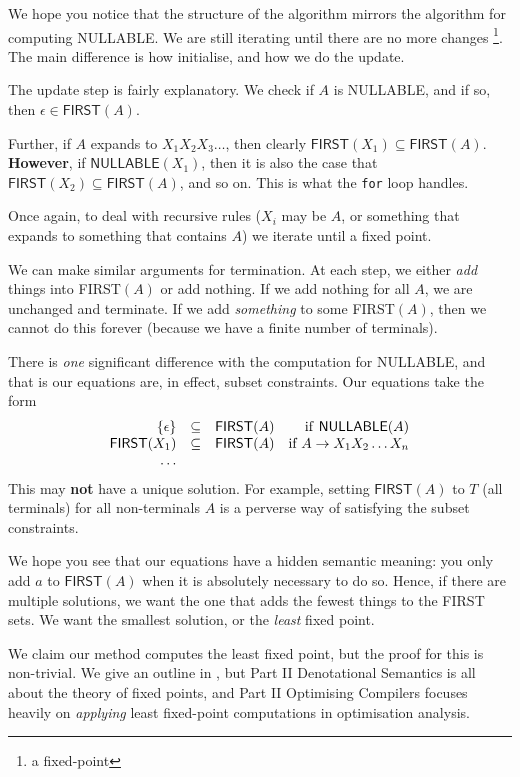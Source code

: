 We hope you notice that the structure of the algorithm mirrors the algorithm for computing \textsf{NULLABLE}. We are still iterating until there are no more changes \footnote{a fixed-point}. The main difference is how initialise, and how we do the update. 

The update step is fairly explanatory. We check if $A$ is \textsf{NULLABLE}, and if so, then $\epsilon \in \textsf{FIRST}(A)$. 

Further, if $A$ expands to $X_1X_2X_3\ldots$, then clearly $\textsf{FIRST}(X_1) \subseteq \textsf{FIRST}(A)$. \textbf{However}, if $\textsf{NULLABLE}(X_1)$, then it is also the case that $\textsf{FIRST}(X_2) \subseteq \textsf{FIRST}(A)$, and so on. This is what the \texttt{for} loop handles.

Once again, to deal with recursive rules ($X_i$ may be $A$, or something that expands to something that contains $A$) we iterate until a fixed point.

We can make similar arguments for termination. At each step, we either \textit{add} things into \textsf{FIRST}$(A)$ or add nothing. If we add nothing for all $A$, we are unchanged and terminate. If we add \textit{something} to some \textsf{FIRST}$(A)$, then we cannot do this forever (because we have a finite number of terminals). 

There is \textit{one} significant difference with the computation for \textsf{NULLABLE}, and that is our equations are, in effect, subset constraints. Our equations take the form
\[
\begin{array}{rclr}
     \{ \epsilon \}&\subseteq&\textsf{FIRST}(A) & \text{if \textsf{NULLABLE}}(A) \\
     \textsf{FIRST}(X_1)&\subseteq&\textsf{FIRST}(A) & \text{if } A \to X_1X_2\ldots X_n \\
     \ldots &&& 
\end{array}
\]
This may \textbf{not} have a unique solution. For example, setting $\textsf{FIRST}(A)$ to $T$ (all terminals) for all non-terminals $A$ is a perverse way of satisfying the subset constraints.

We hope you see that our equations have a hidden semantic meaning: you only add $a$ to $\textsf{FIRST}(A)$ when it is absolutely necessary to do so. Hence, if there are multiple solutions, we want the one that adds the fewest things to the \textsf{FIRST} sets. We want the smallest solution, or the \textit{least} fixed point.

We claim our method computes the least fixed point, but the proof for this is non-trivial. We give an outline in , but \textsf{Part II Denotational Semantics} is all about the theory of fixed points, and \textsf{Part II Optimising Compilers} focuses heavily on \textit{applying} least fixed-point computations in optimisation analysis.

